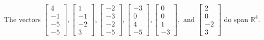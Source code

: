 \begin{exercise}
\begin{exerciseStatement}
  \end{exerciseStatement}
  \begin{exerciseAnswer}
   The vectors \(\left[\begin{array}{r}
4 \\
-1 \\
-5 \\
-5
\end{array}\right] , \left[\begin{array}{r}
1 \\
-1 \\
-2 \\
3
\end{array}\right] , \left[\begin{array}{r}
-2 \\
-3 \\
-2 \\
-5
\end{array}\right] , \left[\begin{array}{r}
-3 \\
0 \\
4 \\
-5
\end{array}\right] , \left[\begin{array}{r}
0 \\
0 \\
1 \\
-3
\end{array}\right] , \text{ and } \left[\begin{array}{r}
2 \\
0 \\
-2 \\
3
\end{array}\right]\) 
  	 do  
	span \(\mathbb{R}^4\).
  


  \end{exerciseAnswer}
\end{exercise}
